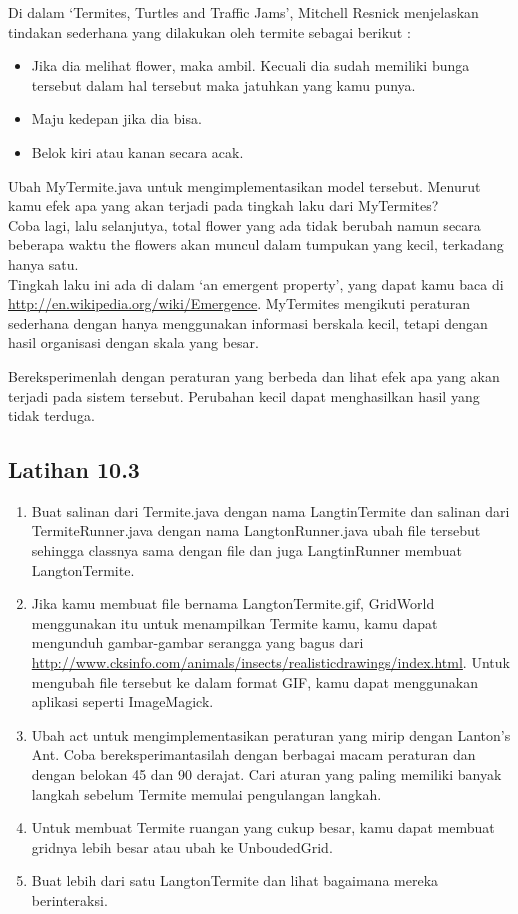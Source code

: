 \documentclass{article}
\begin{document}
	Di dalam ‘Termites, Turtles and Traffic Jams’, Mitchell Resnick menjelaskan tindakan sederhana yang dilakukan oleh termite sebagai berikut : 
	
	\begin{itemize}
		\item Jika dia melihat flower, maka ambil. Kecuali dia sudah memiliki bunga tersebut dalam hal tersebut maka jatuhkan yang kamu punya.
		\item Maju kedepan jika dia bisa.
		\item Belok kiri atau kanan secara acak.
	\end{itemize}
	
	Ubah MyTermite.java untuk mengimplementasikan model tersebut. Menurut kamu efek apa yang akan terjadi pada tingkah laku dari MyTermites?
	\\
	
	Coba lagi, lalu selanjutya, total flower yang ada tidak berubah namun secara beberapa waktu the flowers akan muncul dalam tumpukan yang kecil, terkadang hanya satu.
	\\
	
	Tingkah laku ini ada di dalam ‘an emergent property’, yang dapat kamu baca di \url{http://en.wikipedia.org/wiki/Emergence}. MyTermites mengikuti peraturan sederhana dengan hanya menggunakan informasi berskala kecil, tetapi dengan hasil organisasi dengan skala yang besar.

	Bereksperimenlah dengan peraturan yang berbeda dan lihat efek apa yang akan terjadi pada sistem tersebut. Perubahan kecil dapat menghasilkan hasil yang tidak terduga.

	\subsection*{Latihan 10.3}
	\begin{enumerate}
		\item Buat salinan dari Termite.java dengan nama LangtinTermite dan salinan dari TermiteRunner.java dengan nama LangtonRunner.java ubah file tersebut sehingga classnya sama dengan file dan juga LangtinRunner membuat LangtonTermite.
		\item Jika kamu membuat file bernama LangtonTermite.gif, GridWorld menggunakan itu untuk menampilkan Termite kamu, kamu dapat mengunduh gambar-gambar serangga yang bagus dari \url{http://www.cksinfo.com/animals/insects/realisticdrawings/index.html}. Untuk mengubah file tersebut ke dalam format GIF, kamu dapat menggunakan aplikasi seperti ImageMagick.
		\item Ubah act untuk mengimplementasikan peraturan yang mirip dengan Lanton’s Ant. Coba bereksperimantasilah dengan berbagai macam peraturan dan dengan belokan 45 dan 90 derajat. Cari aturan yang paling memiliki banyak langkah sebelum Termite memulai pengulangan langkah.
		\item Untuk membuat Termite ruangan yang cukup besar, kamu dapat membuat gridnya lebih besar atau ubah ke UnboudedGrid.
		\item Buat lebih dari satu LangtonTermite dan lihat bagaimana mereka berinteraksi.
	\end{enumerate}
	
	
\end{document}

